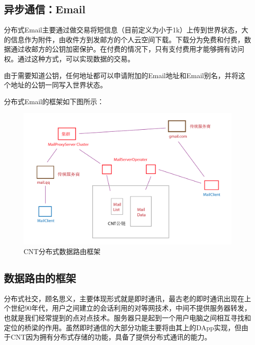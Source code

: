 \documentclass[a4paper,12pt]{article}
\begin{document}
\subsection{异步通信：Email}

分布式Email主要通过做交易将短信息（目前定义为小于1k）上传到世界状态，大的信息作为附件，由收件方到发邮方的个人云空间下载。下载分为免费和付费，数据通过收邮方的公钥加密保护。在付费的情况下，只有支付费用才能够拥有访问权。通过这种方式，可以实现数据的交易。

由于需要知道公钥，任何地址都可以申请附加的Email地址和Email别名，并将这个地址的公钥一同写入世界状态。

分布式Email的框架如下图所示：



\begin {figure} [htbp]
\centering \includegraphics [width = 5in] {pic_cn/cnt_email.png}
\caption {CNT分布式数据路由框架} \label {fig: email}
\end {figure}
\subsection{数据路由的框架}

分布式社交，顾名思义，主要体现形式就是即时通讯，最古老的即时通讯出现在上个世纪90年代，用户之间建立的会话利用的对等网技术，中间不提供服务器转发，也就是我们经常提到的点对点技术。服务器只是起到一个用户电脑之间相互寻找和定位的桥梁的作用。虽然即时通信的大部分功能主要将由其上的DApp实现，但由于CNT因为拥有分布式存储的功能，具备了提供分布式通讯的能力。
\end{document}
